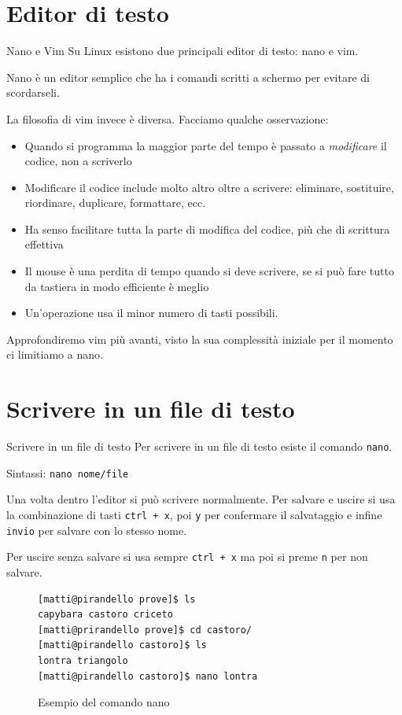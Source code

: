 \documentclass{beamer}
\begin{document}
\section{Editor di testo}
\begin{frame}[fragile]{Nano e Vim}
  Su Linux esistono due principali editor di testo: nano e vim. \smallskip

  Nano è un editor semplice che ha i comandi scritti a schermo per evitare di
  scordarseli. \smallskip

  La filosofia di vim invece è diversa. Facciamo qualche osservazione:
  \begin{itemize}
    \item Quando si programma la maggior parte del tempo è passato a 
      \textit{modificare} il codice, non a scriverlo

    \item Modificare il codice include molto altro oltre a scrivere: eliminare,
      sostituire, riordinare, duplicare, formattare, ecc.

    \item Ha senso facilitare tutta la parte di modifica del codice, più che 
      di scrittura effettiva

    \item Il mouse è una perdita di tempo quando si deve scrivere, se si può
      fare tutto da tastiera in modo efficiente è meglio

    \item Un'operazione usa il minor numero di tasti possibili.
  \end{itemize}

  Approfondiremo vim più avanti, visto la sua complessità iniziale per il
  momento ci limitiamo a nano.
\end{frame}


\section{Scrivere in un file di testo}
\begin{frame}[fragile]{Scrivere in un file di testo}
  Per scrivere in un file di testo esiste il comando \texttt{nano}.\bigskip

  Sintassi: \texttt{nano nome/file}\bigskip

  Una volta dentro l'editor si può scrivere normalmente. Per salvare e uscire
  si usa la combinazione di tasti \texttt{ctrl + x}, poi \texttt{y} per 
  confermare il salvataggio e infine \texttt{invio} per salvare con lo stesso
  nome.\bigskip

  Per uscire senza salvare si usa sempre \texttt{ctrl + x} ma poi si preme
  \texttt{n} per non salvare.

  \begin{figure}
    \begin{lstlisting}[basicstyle=\footnotesize]
[matti@pirandello prove]$ ls 
capybara castoro criceto
[matti@prirandello prove]$ cd castoro/
[matti@pirandello castoro]$ ls
lontra triangolo
[matti@pirandello castoro]$ nano lontra
  \end{lstlisting}
    \caption{Esempio del comando nano}
  \end{figure}
\end{frame}
\end{document}
